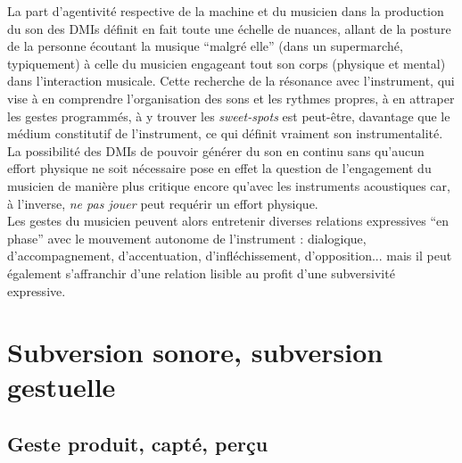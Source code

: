 \indent La part d'agentivité respective de la machine et du musicien dans la production du son des \glspl{DMI} définit en fait toute une échelle de nuances, allant de la posture de la personne écoutant la musique ``malgré elle'' (dans un supermarché, typiquement) à celle du musicien engageant tout son corps (physique et mental) dans l'interaction musicale. Cette recherche de la résonance avec l'instrument, qui vise à en comprendre l'organisation des sons et les rythmes propres, à en attraper les gestes programmés, à y trouver les \textit{sweet-spots} est peut-être, davantage que le médium constitutif de l'instrument, ce qui définit vraiment son instrumentalité. La possibilité des \glspl{DMI} de pouvoir générer du son en continu sans qu'aucun effort physique ne soit nécessaire pose en effet la question de l'engagement du musicien de manière plus critique encore qu'avec les instruments acoustiques car, à l'inverse, \textit{ne pas jouer} peut requérir un effort physique.\\
\indent Les gestes du musicien peuvent alors entretenir diverses relations expressives ``en phase'' avec le mouvement autonome de l'instrument : dialogique, d'accompagnement, d'accentuation, d'infléchissement, d'opposition... mais il peut également s'affranchir d'une relation lisible au profit d'une subversivité expressive.




\section{Subversion sonore, subversion gestuelle}
\label{sec:gesture:subversion}

\subsection{Geste produit, capté, perçu}

